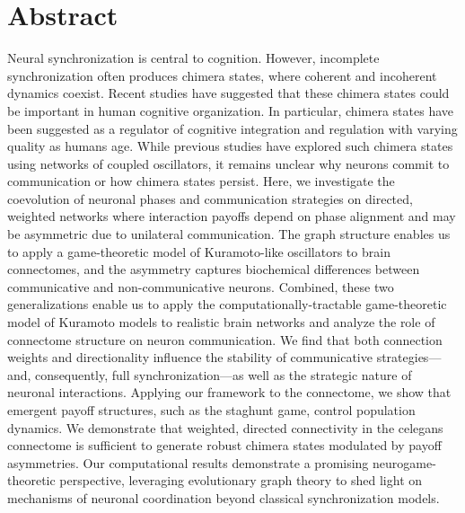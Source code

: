 \documentclass[10pt,letterpaper]{article}
\begin{document}
\section*{Abstract}
Neural synchronization is central to cognition.
However, incomplete synchronization often produces chimera
states,
where coherent and incoherent dynamics coexist.
Recent studies
have suggested that these chimera states
could be important in human cognitive
organization.
In particular, chimera states
have been suggested as a regulator of
cognitive integration and regulation
with varying quality as humans age.
While previous studies
have explored such chimera states
using networks of coupled oscillators,
it remains unclear why neurons commit to communication
or how chimera states persist.
Here, we investigate the coevolution of neuronal phases
and communication strategies on directed, weighted networks
where interaction payoffs depend on phase alignment
and may be asymmetric due to unilateral communication.
The graph structure enables us to apply a game-theoretic model of
Kuramoto-like oscillators to brain connectomes,
and the asymmetry captures biochemical differences between
communicative and non-communicative neurons.
Combined, these two generalizations
enable us to apply the computationally-tractable
game-theoretic model of Kuramoto models to realistic brain networks
and analyze the role of connectome structure on neuron communication.
We find that both connection weights and directionality influence the stability
of communicative strategies---and, consequently,
full synchronization---as well as the strategic nature of neuronal interactions.
Applying our framework to the 
connectome,
we show that emergent payoff structures, such as the staghunt game,
control population dynamics.
We demonstrate that weighted, directed connectivity
in the \gls{celegans} connectome is sufficient to generate robust
chimera states modulated by payoff asymmetries.
Our computational results demonstrate a promising neurogame-theoretic perspective,
leveraging evolutionary graph theory to shed light on mechanisms
of neuronal coordination beyond classical synchronization models.
\end{document}
